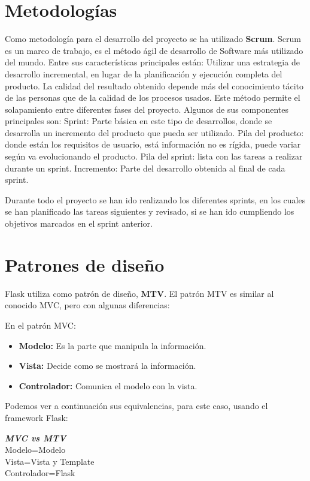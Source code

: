 \section{Metodologías}

Como metodología para el desarrollo del proyecto se ha utilizado \textbf {Scrum}.
Scrum es un marco de trabajo, es el método ágil de desarrollo de Software más utilizado del mundo.
Entre sus características principales están:
Utilizar una estrategia de desarrollo incremental, en lugar de la planificación y ejecución completa del producto. 
La calidad del resultado obtenido depende más del conocimiento tácito de las personas que de la calidad de los procesos usados. 
Este método permite el solapamiento entre diferentes fases del proyecto.
Algunos de sus componentes principales son: 
Sprint: Parte básica en este tipo de desarrollos, donde se desarrolla un incremento del producto que pueda ser utilizado.
Pila del producto: donde están los requisitos de usuario, está información no es rígida, puede variar según va evolucionando el producto.
Pila del sprint: lista con las tareas a realizar durante un sprint.
Incremento: Parte del desarrollo obtenida al final de cada sprint.

Durante todo el proyecto se han ido realizando los diferentes sprints, en los cuales se han planificado las tareas siguientes y revisado, si se han ido cumpliendo los objetivos marcados en el sprint anterior.


\section{Patrones de diseño}

Flask utiliza como patrón de diseño, \textbf {MTV}.
El patrón MTV es similar al conocido MVC, pero con algunas diferencias:

En el patrón MVC:
\begin{itemize}
\item\textbf{Modelo:} Es la parte que manipula la información.
\item\textbf{Vista:} Decide como se mostrará la información.
\item\textbf{Controlador:} Comunica el modelo con la vista.
\end{itemize}
Podemos ver a continuación sus equivalencias, para este caso, usando el framework Flask:


\begin{flushleft}
\textbf{\emph{MVC vs	MTV\\}}
Modelo=Modelo\\
Vista=Vista y Template\\
Controlador=Flask\\
\end{flushleft}



